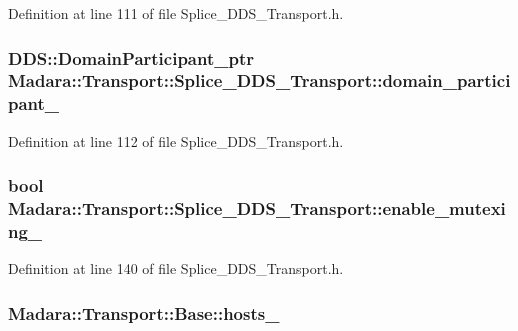 Definition at line 111 of file Splice\_\-DDS\_\-Transport.h.

\hypertarget{classMadara_1_1Transport_1_1Splice__DDS__Transport_aa4c09fbf66b1cd917a625660394b8be7}{
\subsubsection[{domain\_\-participant\_\-}]{\setlength{\rightskip}{0pt plus 5cm}DDS::DomainParticipant\_\-ptr {\bf Madara::Transport::Splice\_\-DDS\_\-Transport::domain\_\-participant\_\-}}}
\label{d0/d91/classMadara_1_1Transport_1_1Splice__DDS__Transport_aa4c09fbf66b1cd917a625660394b8be7}


Definition at line 112 of file Splice\_\-DDS\_\-Transport.h.

\hypertarget{classMadara_1_1Transport_1_1Splice__DDS__Transport_adc6fdc093412dd35dd39393ab46326f4}{
\subsubsection[{enable\_\-mutexing\_\-}]{\setlength{\rightskip}{0pt plus 5cm}bool {\bf Madara::Transport::Splice\_\-DDS\_\-Transport::enable\_\-mutexing\_\-}}}
\label{d0/d91/classMadara_1_1Transport_1_1Splice__DDS__Transport_adc6fdc093412dd35dd39393ab46326f4}


Definition at line 140 of file Splice\_\-DDS\_\-Transport.h.

\hypertarget{classMadara_1_1Transport_1_1Base_a19ac6cbfb41691ad4300a5e696e3b04e}{
\subsubsection[{hosts\_\-}]{ {\bf Madara::Transport::Base::hosts\_\-}}}
\label{dc/d97/classMadara_1_1Transport_1_1Base_a19ac6cbfb41691ad4300a5e696e3b04e}


